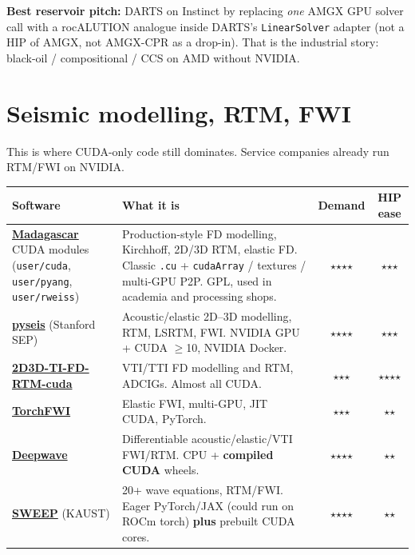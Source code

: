 \documentclass[11pt,a4paper]{article}
\begin{document}
\textbf{Best reservoir pitch:} DARTS on Instinct by replacing \emph{one} AMGX GPU solver
call with a rocALUTION analogue inside DARTS's \texttt{LinearSolver} adapter
(not a HIP of AMGX, not AMGX-CPR as a drop-in).
That is the industrial story: black-oil / compositional / CCS on AMD without NVIDIA.

\section{Seismic modelling, RTM, FWI}

This is where CUDA-only code still dominates.
Service companies already run RTM/FWI on NVIDIA.

\begin{longtable}{@{}p{}p{}cc@{}}
\toprule
Software & What it is & Demand & HIP ease \\
\midrule
\endhead
\href{https://github.com/ahay/src}{\textbf{Madagascar}} CUDA modules
(\texttt{user/cuda}, \texttt{user/pyang}, \texttt{user/rweiss}) &
Production-style FD modelling, Kirchhoff, 2D/3D RTM, elastic FD.
Classic \texttt{.cu} + \texttt{cudaArray} / textures / multi-GPU P2P.
GPL, used in academia and processing shops. &
$\star$$\star$$\star$$\star$ &
$\star$$\star$$\star$ \\
\href{https://github.com/SEP-software/pyseis}{\textbf{pyseis}}
(Stanford SEP) &
Acoustic/elastic 2D--3D modelling, RTM, LSRTM, FWI.
NVIDIA GPU + CUDA $\ge$10, NVIDIA Docker. &
$\star$$\star$$\star$$\star$ &
$\star$$\star$$\star$ \\
\href{https://github.com/Rtoax/2D3D-TI-FD-RTM-cuda}{\textbf{2D3D-TI-FD-RTM-cuda}} &
VTI/TTI FD modelling and RTM, ADCIGs.
Almost all CUDA. &
$\star$$\star$$\star$ &
$\star$$\star$$\star$$\star$ \\
\href{https://github.com/lidongzh/TorchFWI/}{\textbf{TorchFWI}} &
Elastic FWI, multi-GPU, JIT CUDA, PyTorch. &
$\star$$\star$$\star$ &
$\star$$\star$ \\
\href{https://github.com/ar4/deepwave}{\textbf{Deepwave}} &
Differentiable acoustic/elastic/VTI FWI/RTM.
CPU + \textbf{compiled CUDA} wheels. &
$\star$$\star$$\star$$\star$ &
$\star$$\star$ \\
\href{https://github.com/DeepWave-KAUST/sweep}{\textbf{SWEEP}}
(KAUST) &
20+ wave equations, RTM/FWI.
Eager PyTorch/JAX (could run on ROCm torch) \textbf{plus} prebuilt CUDA cores. &
$\star$$\star$$\star$$\star$ &
$\star$$\star$ \\
\bottomrule
\end{longtable}
\end{document}
